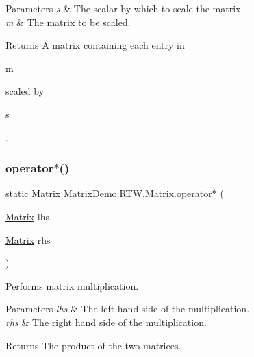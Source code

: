\begin{DoxyParams}{Parameters}
{\em s} & The scalar by which to scale the matrix.\\
\hline
{\em m} & The matrix to be scaled.\\
\hline
\end{DoxyParams}
\begin{DoxyReturn}{Returns}
A matrix containing each entry in 
\begin{DoxyCode}
m
\end{DoxyCode}
 scaled by 
\begin{DoxyCode}
s
\end{DoxyCode}
.
\end{DoxyReturn}
\mbox{\label{class_matrix_demo_1_1_r_t_w_1_1_matrix_a5d72530d3d2ddc47341e82ec1a076b71}} 
\subsubsection{\texorpdfstring{operator$\ast$()}{operator*()}\hspace{0.1cm}{\footnotesize\ttfamily [2/2]}}
{\footnotesize\ttfamily static \mbox{\hyperlink{class_matrix_demo_1_1_r_t_w_1_1_matrix}{Matrix}} Matrix\+Demo.\+R\+T\+W.\+Matrix.\+operator$\ast$ (\begin{DoxyParamCaption}\item[{\mbox{\hyperlink{class_matrix_demo_1_1_r_t_w_1_1_matrix}{Matrix}}}]{lhs,  }\item[{\mbox{\hyperlink{class_matrix_demo_1_1_r_t_w_1_1_matrix}{Matrix}}}]{rhs }\end{DoxyParamCaption})\hspace{0.3cm}{\ttfamily [static]}}



Performs matrix multiplication. 


\begin{DoxyParams}{Parameters}
{\em lhs} & The left hand side of the multiplication.\\
\hline
{\em rhs} & The right hand side of the multiplication.\\
\hline
\end{DoxyParams}
\begin{DoxyReturn}{Returns}
The product of the two matrices.
\end{DoxyReturn}

